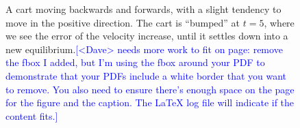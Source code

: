 \documentclass[12pt]{article}
\newcommand{\note}[2][red]{\textcolor{#1}{#2}}
\newcommand{\notedme}[1]{\note[blue]{[<Dave> #1]}}
\begin{document}
\begin{figure}[thp]
	\centering
	
	
	\caption{A cart moving backwards and forwards, with a slight tendency to move in the positive direction. The cart is ``bumped'' at $t=5$, where we see the error of the velocity increase, until it settles down into a new equilibrium.\notedme{needs more work to fit on page: remove the fbox I added, but I'm using the fbox around your PDF to demonstrate that your PDFs include a white border that you want to remove. You also need to ensure there's enough space on the page for the figure and the caption. The \LaTeX{} log file will indicate if the content fits.}}
	\label{1d_position_fig}
\end{figure}
\end{document}
